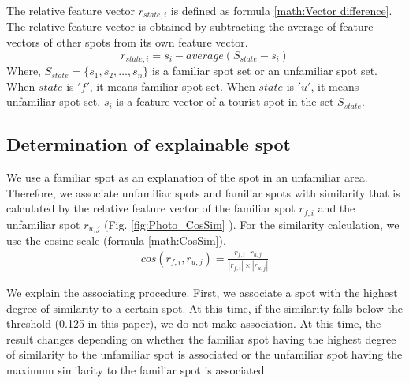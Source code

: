 \documentclass[journal]{IAENGtran}
\begin{document}
The relative feature vector $r_{state,i}$ is defined as formula \ref{math:Vector difference}.
The relative feature vector is obtained by subtracting the average of feature vectors of other spots from its own feature vector.
\begin{equation}
  r_{state,i}=s_i-average(S_{state}-s_i)
  \label{math:Vector difference}
\end{equation}
Where, $S_{state} =\{s_1,s_2,\dots,s_n\}$ is a familiar spot set or an unfamiliar spot set.
When $state$ is $'f'$, it means familiar spot set.
When $state$ is $'u'$, it means unfamiliar spot set.
$s_i$ is a feature vector of a tourist spot in the set $S_{state}$.

\subsection{Determination of explainable spot}
\label{subsec:Determination of explainable spot}
We use a familiar spot as an explanation of the spot in an unfamiliar area.
Therefore, we associate unfamiliar spots and familiar spots with similarity that is calculated by the relative feature vector of the familiar spot $r_{f,i}$ and the unfamiliar spot $r_{u,j}$ (Fig. \ref{fig:Photo_CosSim} ).
For the similarity calculation, we use the cosine scale (formula \ref{math:CosSim}).
\begin{eqnarray}
  cos(r_{f,i},r_{u,j})=\frac{r_{f,i} \cdot r_{u,j}}{|r_{f,i}| \times |r_{u,j}|}
  \label{math:CosSim}
\end{eqnarray}

We explain the associating procedure.
First, we associate a spot with the highest degree of similarity to a certain spot.
At this time, if the similarity falls below the threshold (0.125 in this paper), we do not make association.
At this time, the result changes depending on whether the familiar spot having the highest degree of similarity to the unfamiliar spot is associated or the unfamiliar spot having the maximum similarity to the familiar spot is associated.
\end{document}
